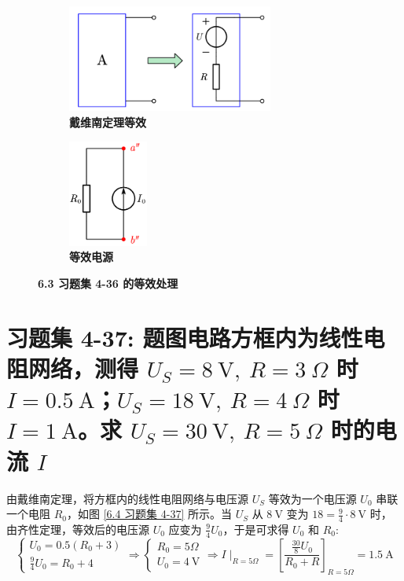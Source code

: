 \documentclass[UTF8]{report}
\theoremstyle{MyLineTheoremStyle} %
\theoremstyle{MyBlockTheoremStyle} %
\theoremstyle{MySubsubsectionStyle} %
\begin{document}
\begin{figure}[H]\centering
\begin{subfigure}[t]{0.6\columnwidth}\centering
    \includegraphics[height=100pt]{assets/6/acd560ff4ae20eb901019a90b84ef837.png}
    \caption{\bfseries 戴维南定理等效 }
\end{subfigure}\hfill
\begin{subfigure}[t]{0.4\columnwidth}\centering
    \includegraphics[height=100pt]{assets/6/7367192b138adaf93ddf5c5fcc94a53b.png}
    \caption{\bfseries 等效电源 }
\end{subfigure}
\caption{\bfseries 6.3 习题集 4-36 的等效处理}\label{6.3 习题集 4-36.2}
\end{figure}

\section{习题集 4-37: 题图电路方框内为线性电阻网络，测得 $U_S = 8 \ \mathrm{V},\ R = 3 \ \Omega$ 时 $I = 0.5 \ \mathrm{A}$；$U_S = 18 \ \mathrm{V},\ R = 4 \ \Omega$ 时 $I = 1 \ \mathrm{A}$。求 $U_S = 30 \ \mathrm{V},\ R = 5 \ \Omega$ 时的电流 $I$}

由戴维南定理，将方框内的线性电阻网络与电压源 $U_S$ 等效为一个电压源 $U_0$ 串联一个电阻 $R_0$，如图 \ref{6.4 习题集 4-37} 所示。当 $U_S$ 从 $8 \ \mathrm{V}$ 变为 $18 = \frac{9}{4} \cdot 8\ \mathrm{V}$ 时，由齐性定理，等效后的电压源 $U_0$ 应变为 $\frac{9}{4}U_0$，于是可求得 $U_0$ 和 $R_0$:
\begin{equation}
\begin{cases}
    U_0 = 0.5 (R_0 + 3)\\ 
    \frac{9}{4}U_0 =  R_0 + 4
\end{cases} 
\Longrightarrow 
\begin{cases}
    R_0 = 5 \Omega \\ 
    U_0 = 4 \ \mathrm{V}
\end{cases}
\Longrightarrow 
\boxed{
    I\mid_{R = 5 \Omega} = \left[\frac{ \frac{30}{8} U_0}{R_0 + R}\right]_{R = 5 \Omega} = 1.5 \ \mathrm{A}
}
\end{equation}
\end{document}
